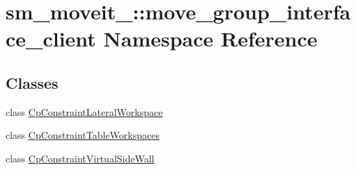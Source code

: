 \hypertarget{namespacesm__moveit__4_1_1move__group__interface__client}{}\section{sm\+\_\+moveit\+\_\+:\+:move\+\_\+group\+\_\+interface\+\_\+client Namespace Reference}
\label{namespacesm__moveit__4_1_1move__group__interface__client}
\subsection*{Classes}
\begin{DoxyCompactItemize}
\item 
class \hyperlink{classsm__moveit__4_1_1move__group__interface__client_1_1CpConstraintLateralWorkspace}{Cp\+Constraint\+Lateral\+Workspace}
\item 
class \hyperlink{classsm__moveit__4_1_1move__group__interface__client_1_1CpConstraintTableWorkspaces}{Cp\+Constraint\+Table\+Workspaces}
\item 
class \hyperlink{classsm__moveit__4_1_1move__group__interface__client_1_1CpConstraintVirtualSideWall}{Cp\+Constraint\+Virtual\+Side\+Wall}
\end{DoxyCompactItemize}
